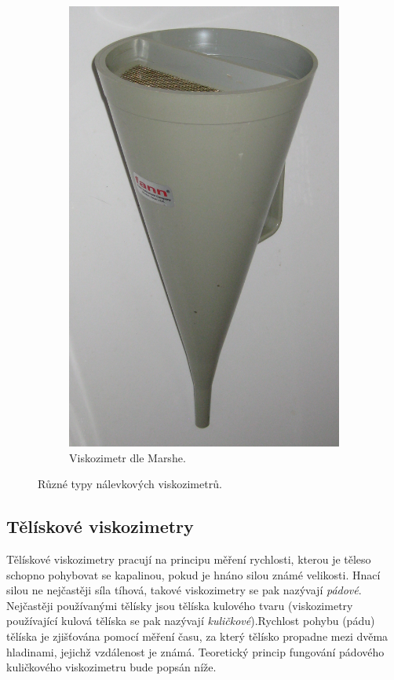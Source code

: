 \documentclass[12pt]{article}
\begin{document}
\begin{figure}
\begin{subfigure}[b]{.3\textwidth}
        \includegraphics[width = \linewidth]{figures/Marsh_funnel.jpg}
        \caption{Viskozimetr dle Marshe.~\cite{Figure:marsh_funnel}}
    \end{subfigure}
    \caption{Různé typy nálevkových viskozimetrů.}
    \label{fig:nalevkove_viskozimetry}
\end{figure}

\subsection{Tělískové viskozimetry}%

Tělískové viskozimetry pracují na principu měření rychlosti, kterou je těleso schopno pohybovat se kapalinou, pokud je hnáno silou známé velikosti. Hnací silou ne nejčastěji síla tíhová, takové viskozimetry se pak nazývají \emph{pádové}. Nejčastěji používanými tělísky jsou tělíska kulového tvaru (viskozimetry používající kulová tělíska se pak nazývají \emph{kuličkové}).\footnotemark Rychlost pohybu (pádu) tělíska je zjišťována pomocí měření času, za který tělísko propadne mezi dvěma hladinami, jejichž vzdálenost je známá. Teoretický princip fungování pádového kuličkového viskozimetru bude popsán níže.
\end{document}
